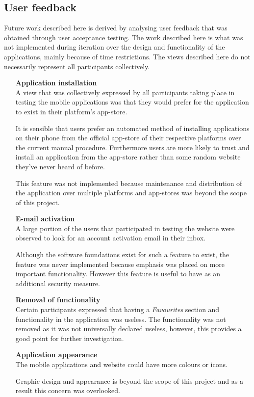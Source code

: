\documentclass[12pt]{ecsproject}     %
\begin{document}
\subsection{User feedback}
Future work described here is derived by analysing user feedback that was obtained through user acceptance testing. The work described here is what was not implemented during iteration over the design and functionality of the applications, mainly because of time restrictions. The views described here do not necessarily represent all participants collectively.

\begin{itemize}
\item[\textbf{Application installation}]\hfill \\
A view that was collectively expressed by all participants taking place in testing the mobile applications was that they would prefer for the application to exist in their platform's app-store.

It is sensible that users prefer an automated method of installing applications on their phone from the official app-store of their respective platforms over the current manual procedure. Furthermore users are more likely to trust and install an application from the app-store rather than some random website they've never heard of before.

This feature was not implemented because maintenance and distribution of the application over multiple platforms and app-stores was beyond the scope of this project.

\item[\textbf{E-mail activation}]\hfill\\
A large portion of the users that participated in testing the website were observed to look for an account activation email in their inbox.

Although the software foundations exist for such a feature to exist, the feature was never implemented because emphasis was placed on more important functionality. However this feature is useful to have as an additional security measure.
\item[\textbf{Removal of functionality}]\hfill \\
Certain participants expressed that having a \textit{Favourites} section and functionality in the application was useless. The functionality was not removed as it was not universally declared useless, however, this provides a good point for further investigation.
\item[\textbf{Application appearance}]\hfill \\
The mobile applications and website could have more colours or icons.

Graphic design and appearance is beyond the scope of this project and as a result this concern was overlooked.
\end{itemize}
\end{document}
